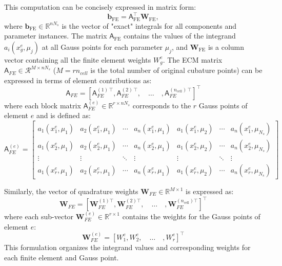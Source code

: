 \documentclass[11pt]{article}
\renewcommand{\vec}[1]{\mathbf{#1}}
\newcommand{\mat}[1]{\mathsf{#1}}
\begin{document}
            This computation can be concisely expressed in matrix form:
            \begin{equation}
            \mathbf{b}_{\text{FE}} = \mat{A}_{\text{FE}}^\top \mathbf{W}_{\text{FE}},
            \end{equation}
            where \(\mathbf{b}_{\text{FE}} \in \mathbb{R}^{nN_s}\) is the vector of "exact" integrals for all components and parameter instances.
            The matrix \(\mat{A}_{\text{FE}}\) contains the values of the integrand \(a_i(x_g^e, \mu_j)\) at all Gauss points for each parameter \(\mu_j\), and \(\mathbf{W}_{\text{FE}}\) is a column vector containing all the finite element weights \(W_g^e\).
            The ECM matrix $\mat{A}_{FE}\in\mathcal{R}^{M\times n N_s}$ ($M = r n_{cell}$ is the total number of original cubature points) can be expressed in terms of element contributions as:
            \begin{equation}
            \mat{A}_{FE} = \left[
            \mat{A}_{FE}^{(1)\,\top},
            \mat{A}_{FE}^{(2)\,\top},\quad
            \hdots\quad
            ,\mat{A}_{FE}^{(n_{\text{cell}})\,\top}
            \right]^\top
            \end{equation}
            where each block matrix \(\mat{A}_{FE}^{(e)} \in \mathbb{R}^{r \times nN_s}\) corresponds to the \(r\) Gauss points of element \(e\) and is defined as:
            \begin{equation}
            \mat{A}_{FE}^{(e)} =
            \begin{bmatrix}
                a_1(x_1^e, \mu_1) & a_2(x_1^e, \mu_1) & \cdots & a_n(x_1^e, \mu_1) & a_1(x_1^e, \mu_2) & \cdots & a_n(x_1^e, \mu_{N_s})\\
                a_1(x_2^e, \mu_1) & a_2(x_2^e, \mu_1) & \cdots & a_n(x_2^e, \mu_1) & a_1(x_2^e, \mu_2) & \cdots & a_n(x_2^e, \mu_{N_s})\\
                \vdots & \vdots & \ddots & \vdots & \vdots & \ddots & \vdots \\
                a_1(x_r^e, \mu_1) & a_2(x_r^e, \mu_1) & \cdots & a_n(x_r^e, \mu_1) & a_1(x_r^e, \mu_2)  & \cdots & a_n(x_r^e, \mu_{N_s})
            \end{bmatrix}
            \end{equation}


            Similarly, the vector of quadrature weights \(\mathbf{W}_{FE} \in \mathbb{R}^{M \times 1}\) is expressed as:
            \begin{equation}
            \mathbf{W}_{FE} = \left[\vec{W}_{FE}^{(1)\top},
            \vec{W}_{FE}^{(2)\top},\quad
            \hdots\quad
            ,\vec{W}_{FE}^{(n_{\text{cell}})\top}\right]^\top
            \label{eq:gaussian_weights}
            \end{equation}
            where each sub-vector \(\vec{W}_{FE}^{(e)} \in \mathbb{R}^{r \times 1}\) contains the weights for the Gauss points of element \(e\):
            \begin{equation}
            \vec{W}_{FE}^{(e)} = \left[ W_1^e, W_2^e, \quad\hdots\quad, W_r^e \right]^\top
            \end{equation}
            This formulation organizes the integrand values and corresponding weights for each finite element and Gauss point.
\end{document}
